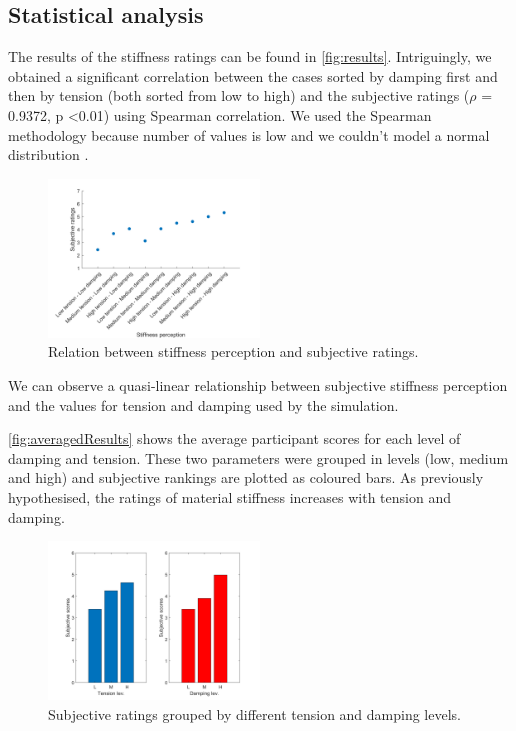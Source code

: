 \documentclass{article}
\begin{document}
\subsection{Statistical analysis}
The results of the stiffness ratings can be found in \autoref{fig:results}. Intriguingly, we obtained a significant correlation between the cases sorted by damping first and then by tension (both sorted from low to high) and the subjective ratings ($\rho$ = 0.9372, p \textless 0.01) using Spearman correlation. We used the Spearman methodology because number of values is low and we couldn't model a normal distribution \cite{Kirk2007}.%
\begin{figure}[t]
\includegraphics[width=0.5\textwidth]{Images/corr_anal}
\caption{Relation between stiffness perception and subjective ratings.}
\centering
\label{fig:results}
\end{figure} 
We can observe a quasi-linear relationship between subjective stiffness perception and the values for tension and damping used by the simulation. %

\autoref{fig:averagedResults} shows the average participant scores for each level of damping and tension. These two parameters were grouped in levels (low, medium and high) and subjective rankings are plotted as coloured bars. As previously hypothesised, the ratings of material stiffness increases with tension and damping.
\begin{figure}[t]
\includegraphics[width=0.5\textwidth]{Images/tens_dump}
\caption{Subjective ratings grouped by different tension and damping levels.}
\centering
\label{fig:averagedResults}
\end{figure} 
\end{document}
